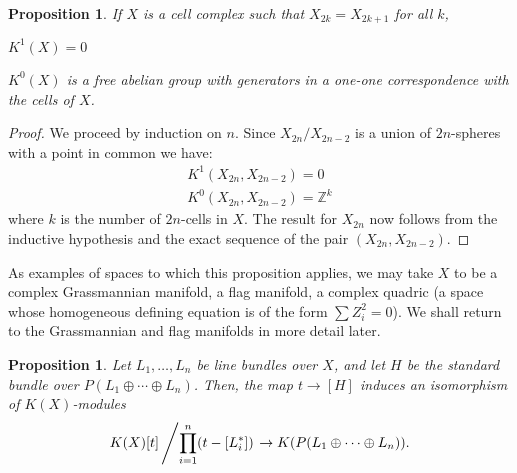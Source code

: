 \documentclass[leqno]{book}
\numberwithin{equation}{section}
\newtheorem{proposition}[theorem]{Proposition}
\theoremstyle{definition}
\begin{document}
            \begin{proposition}
              If $X$ is a cell complex such that $X_{2k}=X_{2k+1}$ for all $k$,
              
              $K^{1}(X)=0$

              $K^{0}(X)$ is a free abelian group with generators in a one-one correspondence with the cells of $X$.
            \end{proposition}

            \begin{proof}
              We proceed by induction on $n$. Since $X_{2n}/X_{2n-2}$ is a union of $2n$-spheres with a point in common we have:
              \begin{equation*}
                \begin{aligned}
                K^{1}(X_{2n},X_{2n-2})=0 \\
                K^{0}(X_{2n},X_{2n-2})=\mathbb{Z}^{k}
                \end{aligned}
              \end{equation*}
              where $k$ is the number of $2n$-cells in $X$. The result for $X_{2n}$ now follows from the inductive hypothesis and the exact sequence of the pair $(X_{2n},X_{2n-2})$.
            \end{proof}
            
            As examples of spaces to which this proposition applies, we may take $X$ to be a complex Grassmannian manifold, a flag manifold, a complex quadric (a space whose homogeneous defining equation is of the form $\sum Z_{i}^{2}=0$). We shall return to the Grassmannian and flag manifolds in more detail later.

            \begin{proposition}
              Let $L_1, \ldots ,L_{n}$ be line bundles over $X$, and let $H$ be the standard bundle over $P(L_1\oplus \cdots \oplus L_{n})$. Then, the map $t\to [H]$ induces an isomorphism of $K(X)$-modules 
              \begin{equation*}
                K(X)[t]\left/\prod_{i=1}^{n} (t-[L_{i}^{*}]) \right. \to K(P(L_1\oplus \cdots\oplus L_{n})).
              \end{equation*}
            \end{proposition}
\end{document}
